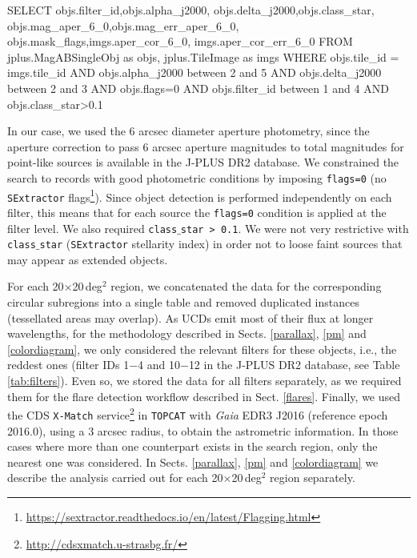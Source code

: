 \newpage

\begin{code}
SELECT objs.filter_id,objs.alpha_j2000,
    objs.delta_j2000,objs.class_star,
    objs.mag_aper_6_0,objs.mag_err_aper_6_0,
    objs.mask_flags,imgs.aper_cor_6_0,
    imgs.aper_cor_err_6_0
FROM jplus.MagABSingleObj as objs,
    jplus.TileImage as imgs
WHERE objs.tile_id = imgs.tile_id
AND objs.alpha_j2000 between 2 and 5
AND objs.delta_j2000 between 2 and 3
AND objs.flags=0
AND objs.filter_id between 1 and 4
AND objs.class_star>0.1
\end{code}

In our case, we used the 6 arcsec diameter aperture photometry, since the aperture correction to pass 6 arcsec aperture magnitudes to total magnitudes for point-like sources is available in the J-PLUS DR2 database. We constrained the search to records with good photometric conditions by imposing  \texttt{flags=0} (no \texttt{SExtractor} flags\footnote{\url{https://sextractor.readthedocs.io/en/latest/Flagging.html}}). Since object detection is performed independently on each filter, this means that for each source the \texttt{flags=0} condition is applied at the filter level. We also required \texttt{class$\_$star > 0.1}. We were not very restrictive with \texttt{class$\_$star} (\texttt{SExtractor} stellarity index) in order not to loose faint sources that may appear as extended objects.

For each 20$\times$20\,deg$^2$ region, we concatenated the data for the corresponding circular subregions into a single table and removed duplicated instances (tessellated areas may overlap). As UCDs emit most of their flux at longer wavelengths, for the methodology described in Sects. \ref{parallax}, \ref{pm} and \ref{colordiagram}, we only considered the relevant filters for these objects, i.e., the reddest ones (filter IDs 1$-$4 and 10$-$12 in the J-PLUS DR2 database, see Table \ref{tab:filters}). Even so, we stored the data for all filters separately, as we required them for the flare detection workflow described in Sect. \ref{flares}. Finally, we used the CDS \texttt{X-Match} service\footnote{\url{http://cdsxmatch.u-strasbg.fr/}} in \texttt{TOPCAT} with \textit{Gaia} EDR3 J2016 (reference epoch 2016.0), using a 3 arcsec radius, to obtain the astrometric information. In those cases where more than one counterpart exists in the search region, only the nearest one was considered. In Sects. \ref{parallax}, \ref{pm} and \ref{colordiagram} we describe the analysis carried out for each 20$\times$20\,deg$^2$ region separately.


